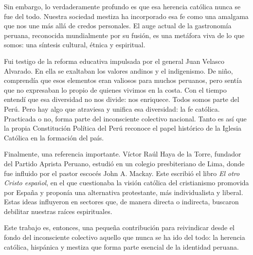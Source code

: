 \documentclass[a4paper,12pt]{article}
\begin{document}
Sin embargo, lo verdaderamente profundo es que esa herencia católica nunca se fue del todo. Nuestra sociedad mestiza ha incorporado esa fe como una amalgama que nos une más allá de credos personales. El auge actual de la gastronomía peruana, reconocida mundialmente por su fusión, es una metáfora viva de lo que somos: una síntesis cultural, étnica y espiritual.

Fui testigo de la reforma educativa impulsada por el general Juan Velasco Alvarado. En ella se exaltaban los valores andinos y el indigenismo. De niño, comprendía que esos elementos eran valiosos para muchos peruanos, pero sentía que no expresaban lo propio de quienes vivimos en la costa. Con el tiempo entendí que esa diversidad no nos divide: nos enriquece. Todos somos parte del Perú. Pero hay algo que atraviesa y unifica esa diversidad: la fe católica. Practicada o no, forma parte del inconsciente colectivo nacional. Tanto es así que la propia Constitución Política del Perú reconoce el papel histórico de la Iglesia Católica en la formación del país.

Finalmente, una referencia importante. Víctor Raúl Haya de la Torre, fundador del Partido Aprista Peruano, estudió en un colegio presbiteriano de Lima, donde fue influido por el pastor escocés John A. Mackay. Este escribió el libro \textit{El otro Cristo español}, en el que cuestionaba la visión católica del cristianismo promovida por España y proponía una alternativa protestante, más individualista y liberal. Estas ideas influyeron en sectores que, de manera directa o indirecta, buscaron debilitar nuestras raíces espirituales.

Este trabajo es, entonces, una pequeña contribución para reivindicar desde el fondo del inconsciente colectivo aquello que nunca se ha ido del todo: la herencia católica, hispánica y mestiza que forma parte esencial de la identidad peruana.
\end{document}
